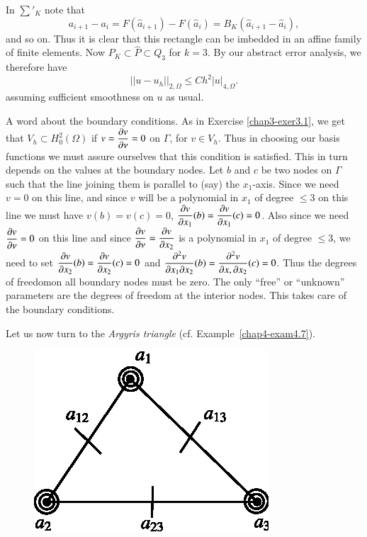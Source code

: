 \begin{example}
In $\sum'_{K}$ note that
\begin{equation*}
a_{i+1}-a_{i}=F(\hat{a}_{i+1})-F(\hat{a}_{i})=B_{K}(\hat{a}_{i+1}-\hat{a}_{i}),\tag{10.7}\label{chap10-eq10.7} 
\end{equation*}
and so on. Thus it is clear that this rectangle can be imbedded in an
affine family of finite elements. Now $P_{K}\subset \hat{P}\subset
Q_{3}$ for $k=3$. By our abstract error analysis, we therefore have
\begin{equation*}
||u-u_{h}||_{2,\Omega}\leq
Ch^{2}|u|_{4,\Omega}.\tag{10.8}\label{chap10-eq10.8} 
\end{equation*}
assuming sufficient smoothness on $u$ as usual.


A word about the boundary conditions. As in Exercise
\ref{chap3-exer3.1}, we get that $V_{h}\subset H^{2}_{0}(\Omega)$ if
$v=\dfrac{\partial v}{\partial \nu}=0$ on $\Gamma$, for $v\in V_{h}$. Thus in
choosing our basis functions we must assure ourselves that this
condition is satisfied. This in turn depends on the values at the
boundary nodes. Let $b$ and $c$ be two nodes on $\Gamma$ such that the
line joining them is parallel to (say) the $x_{1}$-axis. Since we need
$v=0$ on this line, and since $v$ will be a polynomial in $x_{1}$ of
degree $\leq 3$ on this line we must have $v(b)=v(c)=0$, $\dfrac{\partial
  v}{\partial x_{1}}(b)=\dfrac{\partial v}{\partial x_{1}}(c)=0$. Also since we need
$\dfrac{\partial v}{\partial \nu}=0$ on this line and since $\dfrac{\partial v}{\partial
  \nu}=\dfrac{\partial v}{\partial x_{2}}$ is a polynomial in $x_{1}$ of degree
$\leq 3$, we need to set $\dfrac{\partial v}{\partial x_{2}}(b)=\dfrac{\partial v}{\partial
  x_{2}}(c)=0$ and $\dfrac{\partial^{2}v}{\partial x_{1}\partial
  x_{2}}(b)=\dfrac{\partial^{2}v}{\partial x,\partial x_{2}}(c)=0$. Thus the degrees of
freedom\pageoriginale on all boundary nodes must be zero. The only
``free'' or ``unknown'' parameters are the degrees of freedom at the
interior nodes. This takes care of the boundary conditions.
\end{example}

Let us now turn to the {\em Argyris triangle} (cf.\@
Example~\ref{chap4-exam4.7}). 
\begin{figure}[H]
\centering
\includegraphics[scale=1.2]{figure/fig10.2.eps}
\caption{}\label{chap10-fig10.2}
\end{figure}

